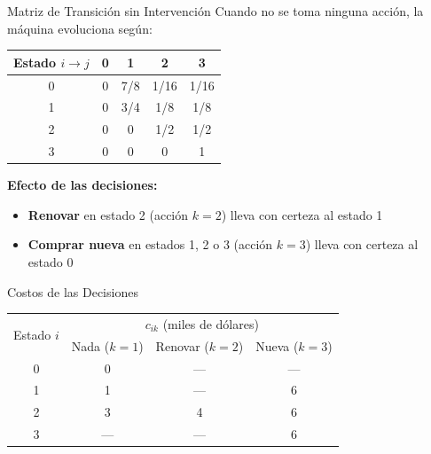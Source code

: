\documentclass{beamer}
\begin{document}
\begin{frame}{Matriz de Transición sin Intervención}
    \small
    Cuando no se toma ninguna acción, la máquina evoluciona según:

    \vspace{0.5em}

    \centering
    \begin{tabular}{c|cccc}
    \toprule
    Estado $i\to j$ & 0 & 1 & 2 & 3 \\
    \midrule
    0 & 0     & 7/8 & 1/16 & 1/16 \\
    1 & 0     & 3/4 & 1/8  & 1/8  \\
    2 & 0     & 0   & 1/2  & 1/2  \\
    3 & 0     & 0   & 0    & 1    \\
    \bottomrule
    \end{tabular}

    \vspace{1em}

    \textbf{Efecto de las decisiones:}
    \begin{itemize}
        \item \textbf{Renovar} en estado 2 (acción $k=2$) lleva con certeza al estado 1
        \item \textbf{Comprar nueva} en estados 1, 2 o 3 (acción $k=3$) lleva con certeza al estado 0
    \end{itemize}
\end{frame}

\begin{frame}{Costos de las Decisiones}
    \small
    \centering
    \begin{tabular}{c|ccc}
    \toprule
    \multirow{2}{*}{Estado $i$} & \multicolumn{3}{c}{$c_{ik}$ (miles de dólares)} \\
      & Nada ($k=1$) & Renovar ($k=2$) & Nueva ($k=3$) \\
    \midrule
    0 & 0 & --- & --- \\
    1 & 1 & --- & 6 \\
    2 & 3 & 4   & 6 \\
    3 & --- & --- & 6 \\
    \bottomrule
    \end{tabular}
\end{frame}
\end{document}
